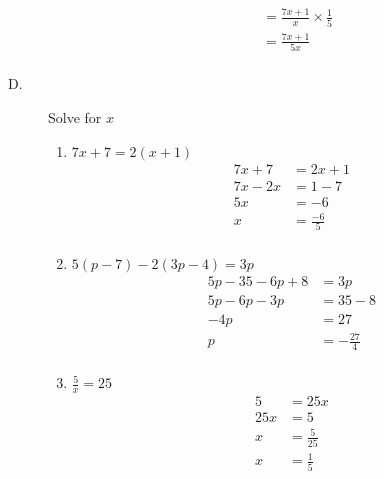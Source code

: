 \documentclass{article}
\begin{document}
\begin{description}
\begin{enumerate}
\begin{equation}
\begin{split}
                          & = \frac{7x+1}{x} \times \frac{1}{5}\\
                          & = \frac{7x+1}{5x}\\
                      \end{split}
                  \end{equation}
        \end{enumerate}
    \item[D. ] Solve for $x$
        \begin{enumerate}
            \item $7x + 7 = 2(x+1)$
                  \begin{equation}
                      \begin{split}
                          7x + 7 & = 2x + 1\\
                          7x - 2x & = 1 - 7\\
                          5x & = -6 \\
                          x  & = \frac{-6}{5}\\
                      \end{split}
                  \end{equation}
            \item $5(p-7)-2(3p-4) = 3p$
                  \begin{equation}
                      \begin{split}
                          5p - 35 - 6p + 8 & = 3p \\
                          5p - 6p - 3p & = 35 - 8 \\
                          -4p & = 27 \\
                          p & = -\frac{27}{4} \\
                      \end{split}
                  \end{equation}
            \item $\frac{5}{x} = 25$
                  \begin{equation}
                      \begin{split}
                          5 & = 25x \\
                          25x & = 5 \\
                          x & = \frac{5}{25}\\
                          x & = \frac{1}{5}\\
                      \end{split}

\end{equation}
\end{enumerate}
\end{description}
\end{document}

